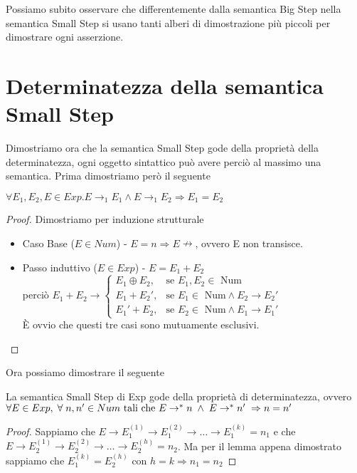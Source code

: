 Possiamo subito osservare che differentemente dalla semantica Big Step
nella semantica Small Step si usano tanti alberi di dimostrazione più piccoli per dimostrare
ogni asserzione. 

\section{Determinatezza della semantica Small Step} 
Dimostriamo ora che la semantica Small Step gode della proprietà
della determinatezza, ogni oggetto sintattico può avere perciò
al massimo una semantica. Prima dimostriamo però il seguente

\begin{teorema}
$\forall E_1, E_2, E \in Exp . E \rightarrow _1 E_1 \land E \rightarrow _1 E_2 \Rightarrow E_1 = E_2 $
\end{teorema}

\begin{proof}
  Dimostriamo per induzione strutturale
  \begin{itemize}
  \item Caso Base ($E \in Num$) - $E = n \Rightarrow E \nrightarrow$, ovvero E non transisce.
  \item Passo induttivo ($E \in Exp$) - $E = E_1 + E_2$ \\
    perciò $E_1 + E_2 \rightarrow \begin{cases} E_1 \oplus E_2, & \mbox{se }E_1, E_2 \in \mbox{ Num} \\
    E_1 + E_2', & \mbox{se }E_1 \in \mbox{ Num} \land E_2 \rightarrow E_2' \\
    E_1' + E_2, & \mbox{se }E_2 \in \mbox{ Num} \land E_1 \rightarrow E_1' \end{cases}$\\
    È ovvio che questi tre casi sono mutuamente esclusivi.
  \end{itemize}
\end{proof}

Ora possiamo dimostrare il seguente

\begin{teorema}[Determinatezza]
La semantica Small Step di Exp gode della proprietà di determinatezza, ovvero
$\forall E \in Exp, \; \forall \; n, n' \in Num \text{ tali che }\\
 E\rightarrow ^* n \; \land \; E \rightarrow ^* n' \; \Rightarrow n = n'$
\end{teorema}

\begin{proof}
  Sappiamo che $E \rightarrow E_1^{(1)} \rightarrow E_1^{(2)} \rightarrow \dots \rightarrow E_1^{(k)} = n_1$ e che 
  $E \rightarrow E_2^{(1)} \rightarrow E_2^{(2)} \rightarrow \dots \rightarrow E_2^{(h)} = n_2$.
  Ma per il lemma appena dimostrato sappiamo che $E_1^{(k)} = E_2^{(h)} \text{ con } h = k \Rightarrow n_1 = n_2$
\end{proof}

